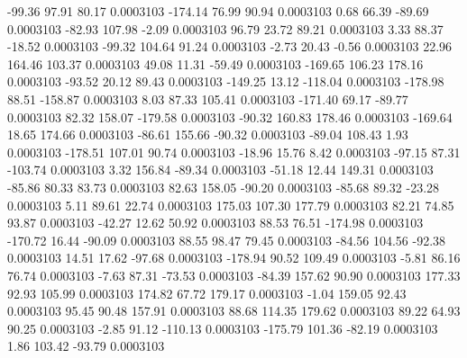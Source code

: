       -99.36       97.91       80.17     0.0003103
     -174.14       76.99       90.94     0.0003103
        0.68       66.39      -89.69     0.0003103
      -82.93      107.98       -2.09     0.0003103
       96.79       23.72       89.21     0.0003103
        3.33       88.37      -18.52     0.0003103
      -99.32      104.64       91.24     0.0003103
       -2.73       20.43       -0.56     0.0003103
       22.96      164.46      103.37     0.0003103
       49.08       11.31      -59.49     0.0003103
     -169.65      106.23      178.16     0.0003103
      -93.52       20.12       89.43     0.0003103
     -149.25       13.12     -118.04     0.0003103
     -178.98       88.51     -158.87     0.0003103
        8.03       87.33      105.41     0.0003103
     -171.40       69.17      -89.77     0.0003103
       82.32      158.07     -179.58     0.0003103
      -90.32      160.83      178.46     0.0003103
     -169.64       18.65      174.66     0.0003103
      -86.61      155.66      -90.32     0.0003103
      -89.04      108.43        1.93     0.0003103
     -178.51      107.01       90.74     0.0003103
      -18.96       15.76        8.42     0.0003103
      -97.15       87.31     -103.74     0.0003103
        3.32      156.84      -89.34     0.0003103
      -51.18       12.44      149.31     0.0003103
      -85.86       80.33       83.73     0.0003103
       82.63      158.05      -90.20     0.0003103
      -85.68       89.32      -23.28     0.0003103
        5.11       89.61       22.74     0.0003103
      175.03      107.30      177.79     0.0003103
       82.21       74.85       93.87     0.0003103
      -42.27       12.62       50.92     0.0003103
       88.53       76.51     -174.98     0.0003103
     -170.72       16.44      -90.09     0.0003103
       88.55       98.47       79.45     0.0003103
      -84.56      104.56      -92.38     0.0003103
       14.51       17.62      -97.68     0.0003103
     -178.94       90.52      109.49     0.0003103
       -5.81       86.16       76.74     0.0003103
       -7.63       87.31      -73.53     0.0003103
      -84.39      157.62       90.90     0.0003103
      177.33       92.93      105.99     0.0003103
      174.82       67.72      179.17     0.0003103
       -1.04      159.05       92.43     0.0003103
       95.45       90.48      157.91     0.0003103
       88.68      114.35      179.62     0.0003103
       89.22       64.93       90.25     0.0003103
       -2.85       91.12     -110.13     0.0003103
     -175.79      101.36      -82.19     0.0003103
        1.86      103.42      -93.79     0.0003103
